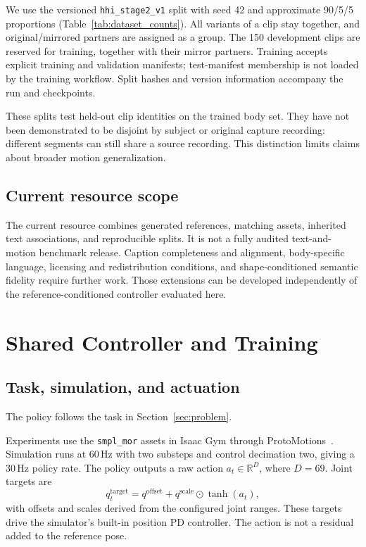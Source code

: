 \documentclass[11pt]{article}
\newcommand{\R}{\mathbb{R}}
\begin{document}
We use the versioned \texttt{hhi\_stage2\_v1} split with seed 42 and approximate
90/5/5 proportions (Table~\ref{tab:dataset_counts}). All variants of a clip
stay together, and original/mirrored partners are assigned as a group.
The 150 development clips are reserved for training, together with their
mirror partners. Training accepts explicit training and validation manifests;
test-manifest membership is not loaded by the training workflow. Split hashes
and version information accompany the run and checkpoints.

These splits test held-out clip identities on the trained body set. They have
not been demonstrated to be disjoint by subject or original capture recording:
different segments can still share a source recording. This distinction
limits claims about broader motion generalization.

\subsection{Current resource scope}

The current resource combines generated references, matching assets, inherited
text associations, and reproducible splits. It is not a fully audited
text-and-motion benchmark release. Caption completeness and alignment,
body-specific language, licensing and redistribution conditions, and
shape-conditioned semantic fidelity require further work. Those extensions
can be developed independently of the reference-conditioned controller
evaluated here.

\section{Shared Controller and Training}\label{sec:method}

\subsection{Task, simulation, and actuation}

The policy follows the task in Section~\ref{sec:problem}.

Experiments use the \texttt{smpl\_mor} assets in Isaac Gym through
ProtoMotions~\cite{isaacgym,protomotions}. Simulation runs at 60\,Hz with two
substeps and control decimation two, giving a 30\,Hz policy rate. The policy
outputs a raw action $a_t\in\R^D$, where $D=69$. Joint targets are
\begin{equation}
    q_t^{\mathrm{target}}
      = q^{\mathrm{offset}}
        + q^{\mathrm{scale}}\odot\tanh(a_t),
    \label{eq:action_mapping}
\end{equation}
with offsets and scales derived from the configured joint ranges. These
targets drive the simulator's built-in position PD controller. The action is
not a residual added to the reference pose.
\end{document}
